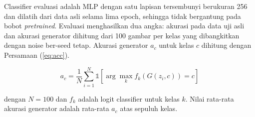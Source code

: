 Classifier evaluasi adalah MLP dengan satu lapisan tersembunyi berukuran 256 dan dilatih dari data asli selama lima epoch, sehingga tidak bergantung pada bobot \textit{pretrained}. Evaluasi menghasilkan dua angka: akurasi pada data uji asli dan akurasi generator dihitung dari 100 gambar per kelas yang dibangkitkan dengan noise ber-seed tetap. Akurasi generator $a_c$ untuk kelas $c$ dihitung dengan Persamaan (\ref{eq:acc}).

\begin{equation}\label{eq:acc}
a_c = \frac{1}{N}\sum_{i=1}^{N} \mathbb{1}\left[\arg\max_k f_k(G(z_i, c)) = c\right]
\end{equation}

dengan $N=100$ dan $f_k$ adalah logit classifier untuk kelas $k$. Nilai rata-rata akurasi generator adalah rata-rata $a_c$ atas sepuluh kelas.
